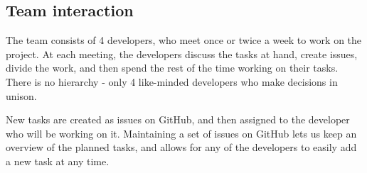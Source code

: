 \subsection{Team interaction}

The team consists of 4 developers, who meet once or twice a week to work on the project. At each meeting, the developers discuss the tasks at hand, create issues, divide the work, and then spend the rest of the time working on their tasks. There is no hierarchy - only 4 like-minded developers who make decisions in unison.

New tasks are created as issues on GitHub, and then assigned to the developer who will be working on it. Maintaining a set of issues on GitHub lets us keep an overview of the planned tasks, and allows for any of the developers to easily add a new task at any time.
